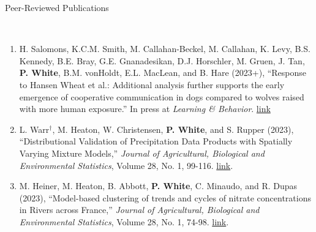 \documentclass[11pt]{article}
\newcommand{\head}[1]{ %
    \bigskip %
    \begin{large}\begin{bf}{#1}\end{bf}\end{large} %

    \ \\ [-1.3cm] %

    \hrulefill}
\begin{document}
\vspace{2mm}
\head{Peer-Reviewed Publications}

\begin{enumerate}[label=$\bullet$]







\item H. Salomons, K.C.M. Smith, M. Callahan-Beckel, M. Callahan, K. Levy, B.S. Kennedy, B.E. Bray, G.E. Gnanadesikan, D.J. Horschler, M. Gruen, J. Tan, \textbf{P. White}, B.M. vonHoldt, E.L. MacLean, and B. Hare (2023+), ``Response to Hansen Wheat et al.: Additional analysis further supports the early emergence of cooperative communication in dogs compared to wolves raised with more human exposure.'' In press at \emph{Learning \& Behavior}. \href{https://doi.org/10.3758/s13420-023-00576-2}{link}







\item L. Warr$^\dagger$, M. Heaton, W. Christensen, \textbf{P. White}, and S. Rupper (2023), ``Distributional Validation of Precipitation Data Products with Spatially Varying Mixture Models,'' \emph{Journal of Agricultural, Biological and Environmental Statistics}, Volume 28, No. 1, 99-116. \href{https://doi.org/10.1007/s13253-022-00515-0}{link}.

\item M. Heiner, M. Heaton, B. Abbott, \textbf{P. White}, C. Minaudo, and R. Dupas (2023), ``Model-based clustering of trends and cycles of nitrate concentrations in Rivers across France,'' \emph{Journal of Agricultural, Biological and Environmental Statistics}, Volume 28, No. 1, 74-98. \href{https://doi.org/10.1007/s13253-022-00513-2}{link}.



\end{enumerate}
\end{document}
